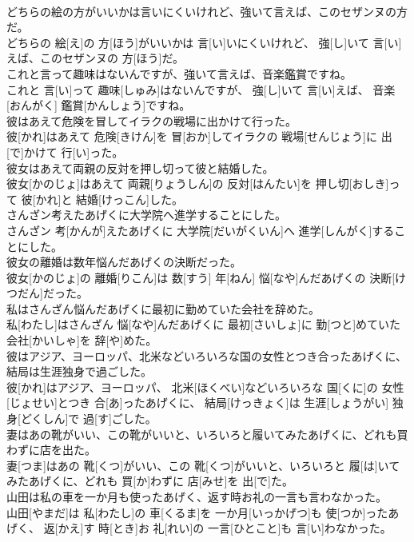 \documentclass[8pt]{extreport}
\begin{document}
\begin{CJK}{UTF8}{min}
\\	どちらの絵の方がいいかは言いにくいけれど、強いて言えば、このセザンヌの方だ。	
\\	どちらの 絵[え]の 方[ほう]がいいかは 言[い]いにくいけれど、 強[し]いて 言[い]えば、このセザンヌの 方[ほう]だ。
\\	これと言って趣味はないんですが、強いて言えば、音楽鑑賞ですね。	
\\	これと 言[い]って 趣味[しゅみ]はないんですが、 強[し]いて 言[い]えば、 音楽[おんがく] 鑑賞[かんしょう]ですね。
\\	彼はあえて危険を冒してイラクの戦場に出かけて行った。	
\\	彼[かれ]はあえて 危険[きけん]を 冒[おか]してイラクの 戦場[せんじょう]に 出[で]かけて 行[い]った。
\\	彼女はあえて両親の反対を押し切って彼と結婚した。	
\\	彼女[かのじょ]はあえて 両親[りょうしん]の 反対[はんたい]を 押し切[おしき]って 彼[かれ]と 結婚[けっこん]した。
\\	さんざン考えたあげくに大学院へ進学することにした。	
\\	さんざン 考[かんが]えたあげくに 大学院[だいがくいん]へ 進学[しんがく]することにした。
\\	彼女の離婚は数年悩んだあげくの決断だった。	
\\	彼女[かのじょ]の 離婚[りこん]は 数[すう] 年[ねん] 悩[なや]んだあげくの 決断[けつだん]だった。
\\	私はさんざん悩んだあげくに最初に勤めていた会社を辞めた。	
\\	私[わたし]はさんざん 悩[なや]んだあげくに 最初[さいしょ]に 勤[つと]めていた 会社[かいしゃ]を 辞[や]めた。
\\	彼はアジア、ヨーロッパ、北米などいろいろな国の女性とつき合ったあげくに、結局は生涯独身で過ごした。	
\\	彼[かれ]はアジア、ヨーロッパ、 北米[ほくべい]などいろいろな 国[くに]の 女性[じょせい]とつき 合[あ]ったあげくに、 結局[けっきょく]は 生涯[しょうがい] 独身[どくしん]で 過[す]ごした。
\\	妻はあの靴がいい、この靴がいいと、いろいろと履いてみたあげくに、どれも買わずに店を出た。	
\\	妻[つま]はあの 靴[くつ]がいい、この 靴[くつ]がいいと、いろいろと 履[は]いてみたあげくに、どれも 買[か]わずに 店[みせ]を 出[で]た。
\\	山田は私の車を一か月も使ったあげく、返す時お礼の一言も言わなかった。	
\\	山田[やまだ]は 私[わたし]の 車[くるま]を 一か月[いっかげつ]も 使[つか]ったあげく、 返[かえ]す 時[とき]お 礼[れい]の 一言[ひとこと]も 言[い]わなかった。

\end{CJK}
\end{document}
